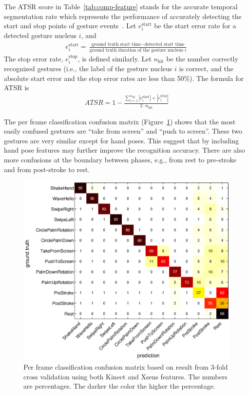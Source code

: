 \documentclass{sig-alternate-2013}
\begin{document}
The ATSR score in Table~\ref{tab:comp-feature} stands for the accurate temporal
segmentation rate which represents the performance of accurately
detecting the start and stop points of gesture events~\cite{Ruffieux2013}.
Let $e^\text{start}_i$ be the start error rate for a detected gesture nucleus
$i$, and
\begin{align*}
e^\text{start}_i = \frac{\text{ground truth start time} - \text{detected start
time}}{\text{ground truth duration of the gesture nucleus }i}
\end{align*}
The stop error rate, $e_i^\text{stop}$, is defined similarly.
Let $n_{\text{hit}}$ be the number correctly recognized gestures (i.e., the
label of the gesture nucleus $i$ is correct, and the absolute start error and
the stop error rates are less than 50\%). The formula for ATSR
is
\begin{align*}
ATSR = 1 - \frac{\sum_{i = 1}^{n_{\text{hit}}} |e^\text{start}_i| +
|e_i^\text{stop}|}{2\cdot n_{\text{hit}}}
\end{align*}

The per frame classification confusion matrix (Figure~\ref{fig:confusion}) shows that the most easily confused gestures are ``take from screen'' and ``push to screen''. These two gestures are very similar except for hand
poses. This suggest that by including hand pose features may further improve
the recognition accuracy. There are also more confusions at the boundary between phases, e.g., 
from rest to pre-stroke and from post-stroke to rest.

\begin{figure}[tb]
\centering
\includegraphics[trim={6cm 3.5cm 10cm 1.5cm}, clip, width=1\columnwidth]{fig/confusion-matrix.eps}
\caption{Per frame classification confusion matrix based on result from 3-fold cross validation using both Kinect and Xsens
features. The numbers are percentages. The darker the color the higher the percentage.}
\label{fig:confusion}
\end{figure}
\end{document}
